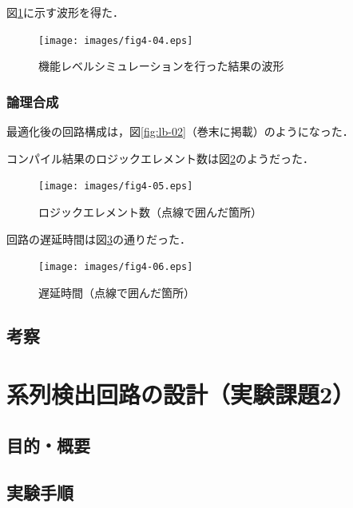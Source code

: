 \documentclass[uplatex]{jsarticle}
\begin{document}
図\ref{fig:4-04}に示す波形を得た．

\begin{figure}[htb]
  \begin{center}
    \texttt{[image: images/fig4-04.eps]}
    \caption{機能レベルシミュレーションを行った結果の波形}
    \label{fig:4-04}
  \end{center}
\end{figure}

\subsubsection{論理合成}

最適化後の回路構成は，図\ref{fig:lb-02}（巻末に掲載）のようになった．

コンパイル結果のロジックエレメント数は図\ref{fig:4-05}のようだった． 

\begin{figure}[htb]
  \begin{center}
    \texttt{[image: images/fig4-05.eps]}
    \caption{ロジックエレメント数（点線で囲んだ箇所）}
    \label{fig:4-05}
  \end{center}
\end{figure}

回路の遅延時間は図\ref{fig:4-06}の通りだった．

\begin{figure}[htb]
  \begin{center}
    \texttt{[image: images/fig4-06.eps]}
    \caption{遅延時間（点線で囲んだ箇所）}
    \label{fig:4-06}
  \end{center}
\end{figure}


\subsection{考察}

\clearpage

\section{系列検出回路の設計（実験課題2）}

\subsection{目的・概要}

\subsection{実験手順}
\end{document}
